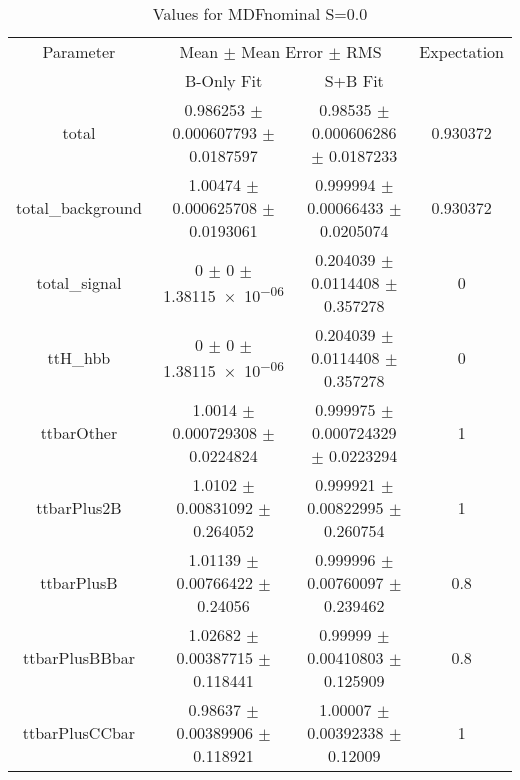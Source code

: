 \begin{table}
\centering
\caption{Values for MDFnominal S=0.0}
\begin{tabular}{cccc}
\toprule
Parameter & \multicolumn{2}{c}{Mean $\pm$ Mean Error $\pm$ RMS} & Expectation\\
 & B-Only Fit & S+B Fit & \\
\midrule
total & \num{0.986253} $\pm$ \num{0.000607793} $\pm$ \num{0.0187597} & \num{0.98535} $\pm$ \num{0.000606286} $\pm$ \num{0.0187233} & \num{0.930372}\\
total\_background & \num{1.00474} $\pm$ \num{0.000625708} $\pm$ \num{0.0193061} & \num{0.999994} $\pm$ \num{0.00066433} $\pm$ \num{0.0205074} & \num{0.930372}\\
total\_signal & \num{0} $\pm$ \num{0} $\pm$ \num{1.38115e-06} & \num{0.204039} $\pm$ \num{0.0114408} $\pm$ \num{0.357278} & \num{0}\\
ttH\_hbb & \num{0} $\pm$ \num{0} $\pm$ \num{1.38115e-06} & \num{0.204039} $\pm$ \num{0.0114408} $\pm$ \num{0.357278} & \num{0}\\
ttbarOther & \num{1.0014} $\pm$ \num{0.000729308} $\pm$ \num{0.0224824} & \num{0.999975} $\pm$ \num{0.000724329} $\pm$ \num{0.0223294} & \num{1}\\
ttbarPlus2B & \num{1.0102} $\pm$ \num{0.00831092} $\pm$ \num{0.264052} & \num{0.999921} $\pm$ \num{0.00822995} $\pm$ \num{0.260754} & \num{1}\\
ttbarPlusB & \num{1.01139} $\pm$ \num{0.00766422} $\pm$ \num{0.24056} & \num{0.999996} $\pm$ \num{0.00760097} $\pm$ \num{0.239462} & \num{0.8}\\
ttbarPlusBBbar & \num{1.02682} $\pm$ \num{0.00387715} $\pm$ \num{0.118441} & \num{0.99999} $\pm$ \num{0.00410803} $\pm$ \num{0.125909} & \num{0.8}\\
ttbarPlusCCbar & \num{0.98637} $\pm$ \num{0.00389906} $\pm$ \num{0.118921} & \num{1.00007} $\pm$ \num{0.00392338} $\pm$ \num{0.12009} & \num{1}\\
\bottomrule
\end{tabular}
\end{table}